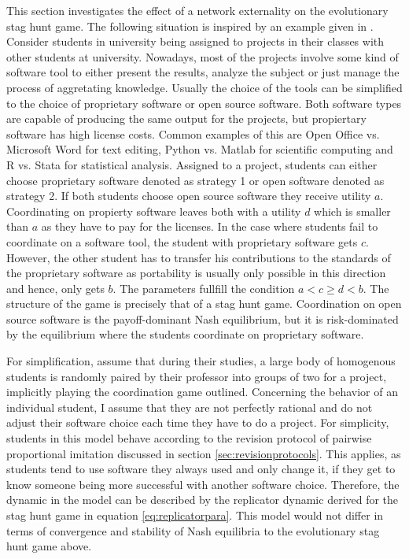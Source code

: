 \label{sec:simplemodel}
This section investigates the effect of a network externality on the
evolutionary stag hunt game. The following situation is inspired by an
example given in \textcite{kandori_learning_1993}. 
Consider students in university being assigned to
projects in their classes with other students at university. 
Nowadays, most of the projects involve some kind of software tool to either 
present the results, analyze the subject or just manage the process of aggretating 
knowledge. Usually the choice of the tools can be simplified to 
the choice of proprietary software or open source software. 
Both software types are capable of producing the same output for the
projects, but propiertary software has high license costs.
Common examples of this are Open Office vs. Microsoft Word for text editing,
Python vs. Matlab for scientific computing and R vs. Stata for statistical
analysis. Assigned to a project, students can either choose proprietary
software denoted as strategy 1 or open software denoted as strategy 2.
If both students choose open source software they receive utility $a$.
Coordinating on propierty software leaves both with a utility $d$ which is
smaller than $a$ as they have to pay for the licenses. In the case 
where students fail to coordinate on a software tool, the student
with proprietary software gets $c$. However, the other student
has to transfer his contributions to the standards of the proprietary software
as portability is usually only possible in this direction and hence, only 
gets $b$. The parameters fullfill the condition $a < c \geq d <b$.
The structure of the game is precisely that of a stag hunt game. 
Coordination on open source software is the payoff-dominant Nash equilibrium,
but it is risk-dominated by the equilibrium where the students coordinate on
proprietary software. 

For simplification, assume that during their studies, a large body of 
homogenous students is randomly paired by their professor into groups of two 
for a project, implicitly playing the coordination game outlined. 
Concerning the behavior of an individual student, I assume that they are 
not perfectly rational and do not adjust their software choice 
each time they have to do a project.
For simplicity, students in this model behave according to the 
revision protocol of pairwise proportional imitation discussed in section 
\ref{sec:revisionprotocols}. 
This applies, as students tend to use software they always used and 
only change it, if they get to know someone being more successful with
another software choice. Therefore, the dynamic in the model can be 
described by the replicator dynamic derived for the stag hunt game in 
equation \eqref{eq:replicatorpara}.
This model would not differ in terms of convergence and stability of Nash 
equilibria to the evolutionary stag hunt game above.


